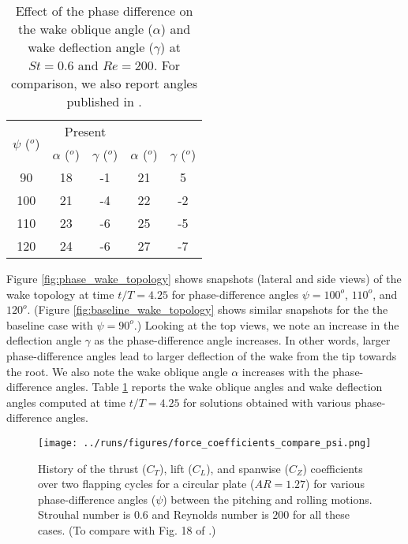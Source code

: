 \begin{table}
  \centering
  \begin{tabular}{ccccc}
    \hline\hline
    \multirow{2}{*}{$\psi$ ($^o$)} &
      \multicolumn{2}{c}{Present} &
      \multicolumn{2}{c}{\citet{li_dong_2016}} \\
    & $\alpha$ ($^o$) & $\gamma$ ($^o$) & $\alpha$ ($^o$) & $\gamma$ ($^o$) \\
    \hline
    90 & 18 & -1 & 21 & 5 \\
    100 & 21 & -4 & 22 & -2 \\
    110 & 23 & -6 & 25 & -5 \\
    120 & 24 & -6 & 27 & -7 \\
    \hline\hline
  \end{tabular}
  \caption{Effect of the phase difference on the wake oblique angle ($\alpha$) and wake deflection angle ($\gamma$) at $St = 0.6$ and $Re = 200$. For comparison, we also report angles published in \citet{li_dong_2016}.}
  \label{tab:phase_angles}
\end{table}

Figure \ref{fig:phase_wake_topology} shows snapshots (lateral and side views) of the wake topology at time $t/T = 4.25$ for phase-difference angles $\psi = 100^o$, $110^o$, and $120^o$.
(Figure \ref{fig:baseline_wake_topology} shows similar snapshots for the the baseline case with $\psi = 90^o$.)
Looking at the top views, we note an increase in the deflection angle $\gamma$ as the phase-difference angle increases.
In other words, larger phase-difference angles lead to larger deflection of the wake from the tip towards the root.
We also note the wake oblique angle $\alpha$ increases with the phase-difference angles.
Table \ref{tab:phase_angles} reports the wake oblique angles and wake deflection angles computed at time $t/T = 4.25$ for solutions obtained with various phase-difference angles.

\begin{figure}
  \centering
  \texttt{[image: ../runs/figures/force\_coefficients\_compare\_psi.png]}
  \caption{History of the thrust ($C_T$), lift ($C_L$), and spanwise ($C_Z$) coefficients over two flapping cycles for a circular plate ($AR = 1.27$) for various phase-difference angles ($\psi$) between the pitching and rolling motions. Strouhal number is $0.6$ and Reynolds number is $200$ for all these cases. (To compare with Fig. 18 of \citet{li_dong_2016}.)}
  \label{fig:phase_force_coefficients}
\end{figure}

